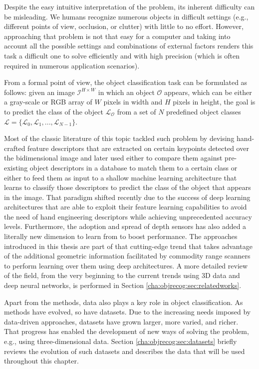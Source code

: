 Despite the easy intuitive interpretation of the problem, its inherent difficulty can be misleading. We humans recognize numerous objects in difficult settings (e.g., different points of view, occlusion, or clutter) with little to no effort. However, approaching that problem is not that easy for a computer and taking into account all the possible settings and combinations of external factors renders this task a difficult one to solve efficiently and with high precision (which is often required in numerous application scenarios).

From a formal point of view, the object classification task can be formulated as follows: given an image $\mathcal{I}^{H\times W}$ in which an object $\mathcal{O}$ appears, which can be either a gray-scale or RGB array of $W$ pixels in width and $H$ pixels in height, the goal is to predict the class of the object $\mathcal{L_O}$ from a set of $N$ predefined object classes $\mathcal{L} = \{\mathcal{L}_0, \mathcal{L}_1, ..., \mathcal{L}_{N-1}\}$.

Most of the classic literature of this topic tackled such problem by devising hand-crafted feature descriptors that are extracted on certain keypoints detected over the bidimensional image and later used either to compare them against pre-existing object descriptors in a database to match them to a certain class or either to feed them as input to a shallow machine learning architecture that learns to classify those descriptors to predict the class of the object that appears in the image. That paradigm shifted recently due to the success of deep learning architectures that are able to exploit their feature learning capabilities to avoid the need of hand engineering descriptors while achieving unprecedented accuracy levels. Furthermore, the adoption and spread of depth sensors has also added a literally new dimension to learn from to boost performance. The approaches introduced in this thesis are part of that cutting-edge trend that takes advantage of the additional geometric information facilitated by commodity range scanners to perform learning over them using deep architectures. A more detailed review of the field, from the very beginning to the current trends using 3D data and deep neural networks, is performed in Section \ref{cha:objrecog:sec:relatedworks}.

Apart from the methods, data also plays a key role in object classification. As methods have evolved, so have datasets. Due to the increasing needs imposed by data-driven approaches, datasets have grown larger, more varied, and richer. That progress has enabled the development of new ways of solving the problem, e.g., using three-dimensional data. Section \ref{cha:objrecog:sec:datasets} briefly reviews the evolution of such datasets and describes the data that will be used throughout this chapter. 

